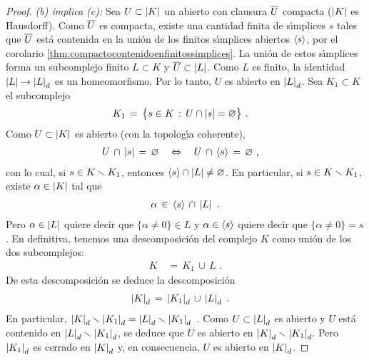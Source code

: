 \begin{proof}
	\emph{(b) implica (c):} Sea $U\subset\left|K\right|$ un abierto con clausura
	$\overline{U}$ compacta ($\left|K\right|$ es Hausdorff). Como $\overline{U}$ es
	compacta, existe una cantidad finita de s\'{\i}mplices $s$
	tales que $\overline{U}$ est\'{a} contenida en la uni\'{o}n de los finitos
	s\'{\i}mplices abiertos $\langle s\rangle$, por el corolario
	\ref{thm:compactocontenidoenfinitossimplices}. La uni\'{o}n de estos
	s\'{\i}mplices forma un subcomplejo finito $L\subset K$ y
	$\overline{U}\subset\left|L\right|$. Como $L$ es finito, la identidad
	$\left|L\right|\rightarrow\left|L\right|_{d}$ es un homeomorfismo. Por lo tanto,
	$U$ es abierto en $\left|L\right|_{d}$. Sea $K_{1}\subset K$ el subcomplejo
	\begin{align*}
		K_{1} &\,=\,\big\{ s\in K\,:\,U\cap \left|s\right|=\varnothing\big\}
		\text{ .}
	\end{align*}
	Como $U\subset\left|K\right|$ es abierto (con la topolog\'{\i}a coherente),
	\begin{align*}
		U\,\cap\,\left|s\right|\,=\,\varnothing & \quad\Leftrightarrow\quad
			U\,\cap\,\langle s\rangle\,=\,\varnothing
		\text{ ,}
	\end{align*}
	con lo cual, si $s\in K\smallsetminus K_{1}$, entonces
	$\langle s\rangle\cap\left|L\right|\not=\varnothing$. En particular,
	si $s\in K\smallsetminus K_{1}$, existe $\alpha\in\left|K\right|$ tal que
	\begin{align*}
		\alpha\,\in\,\langle s\rangle\,\cap\,\left|L\right|
		\text{ .}
	\end{align*}
	Pero $\alpha\in\left|L\right|$ quiere decir que $\{\alpha\not=0\}\in L$
	y $\alpha\in\langle s\rangle$ quiere decir que
	$\{\alpha\not=0\}=s$. En definitiva, tenemos una descomposici\'{o}n
	del complejo $K$ como uni\'{o}n de los dos subcomplejos:
	\begin{align*}
		K & \,=\, K_{1}\,\cup\,L
		\text{ .}
	\end{align*}
	De esta descomposici\'{o}n se deduce la descomposici\'{o}n
	\begin{align*}
		\left|K\right|_{d} & \,=\,\left|K_{1}\right|_{d}\,\cup\,
					\left|L\right|_{d}
		\text{ .}
	\end{align*}
	En particular,
	\begin{math}
		\left|K\right|_{d}\smallsetminus\left|K_{1}\right|_{d}=
			\left|L\right|_{d}\smallsetminus\left|K_{1}\right|_{d}
	\end{math}~.
	Como $U\subset\left|L\right|_{d}$ es abierto y $U$ est\'{a} contenido en
	$\left|L\right|_{d}\smallsetminus\left|K_{1}\right|_{d}$, se deduce que $U$ es abierto
	en $\left|K\right|_{d}\smallsetminus\left|K_{1}\right|_{d}$. Pero
	$\left|K_{1}\right|_{d}$ es cerrado en $\left|K\right|_{d}$ y, en consecuencia,
	$U$ es abierto en $\left|K\right|_{d}$.


\end{proof}
